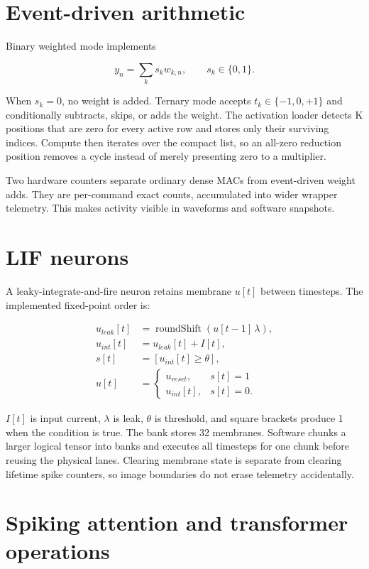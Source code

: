 \documentclass[10pt]{article}
\begin{document}
\section{Event-driven arithmetic}

Binary weighted mode implements

\[
  y_n=\sum_k s_k w_{k,n},\qquad s_k\in\{0,1\}.
\]

When $s_k=0$, no weight is added. Ternary mode accepts
$t_k\in\{-1,0,+1\}$ and conditionally subtracts, skips, or adds the weight.
The activation loader detects K positions that are zero for every active row
and stores only their surviving indices. Compute then iterates over the compact
list, so an all-zero reduction position removes a cycle instead of merely
presenting zero to a multiplier.

Two hardware counters separate ordinary dense MACs from event-driven weight
adds. They are per-command exact counts, accumulated into wider wrapper
telemetry. This makes activity visible in waveforms and software snapshots.

\section{LIF neurons}

A leaky-integrate-and-fire neuron retains membrane $u[t]$ between timesteps.
The implemented fixed-point order is:

\begin{align*}
  u_{leak}[t] &= \operatorname{roundShift}(u[t-1]\,\lambda),\\
  u_{int}[t] &= u_{leak}[t]+I[t],\\
  s[t] &= [u_{int}[t]\geq\theta],\\
  u[t] &= \begin{cases}u_{reset},&s[t]=1\\u_{int}[t],&s[t]=0.\end{cases}
\end{align*}

$I[t]$ is input current, $\lambda$ is leak, $\theta$ is threshold, and square
brackets produce 1 when the condition is true. The bank stores 32 membranes.
Software chunks a larger logical tensor into banks and executes all timesteps
for one chunk before reusing the physical lanes. Clearing membrane state is
separate from clearing lifetime spike counters, so image boundaries do not
erase telemetry accidentally.

\section{Spiking attention and transformer operations}
\end{document}
